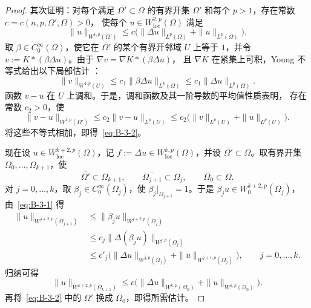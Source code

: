 \begin{proof}
其次证明：对每个满足 $\overline{\Omega'}\subset\Omega$ 的有界开集
$\Omega'$
和每个 $p>1$，存在常数 $c=c(n,p,\Omega',\Omega)>0$，
使每个 $u\in W^{2,p}_{\mathrm{loc}}(\Omega)$ 满足
\begin{equation}\label{eq:B-3-2}
  \|u\|_{W^{1,p}(\Omega')}
  \le c\bigl(\|\Delta u\|_{L^p(\Omega)}
  +\|u\|_{L^p(\Omega)}\bigr).
\end{equation}
取 $\beta\in C^\infty_0(\Omega)$，使它在
$\overline{\Omega'}$ 的某个有界开邻域 $U$ 上等于 $1$，并令
$v:=K*(\beta\Delta u)$。由于 $\nabla v=\nabla K*(\beta\Delta u)$，
且 $\nabla K$ 在紧集上可积，Young 不等式给出以下局部估计
：
\[
  \|v\|_{W^{1,p}(U)}
  \le c_1\|\beta\Delta u\|_{L^p(\Omega)}
  \le c_1\|\Delta u\|_{L^p(\Omega)}.
\]
函数 $v-u$ 在 $U$ 上调和。于是，调和函数及其一阶导数的平均值性质表明，
存在常数 $c_2>0$，使
\[
  \|v-u\|_{W^{1,p}(\Omega')}
  \le c_2\|v-u\|_{L^p(U)}
  \le c_2\bigl(\|v\|_{L^p(U)}+\|u\|_{L^p(U)}\bigr).
\]
将这些不等式相加，即得~\eqref{eq:B-3-2}。

现在设 $u\in W^{k+2,p}_{\mathrm{loc}}(\Omega)$，记
$f:=\Delta u\in W^{k,p}_{\mathrm{loc}}(\Omega)$，并设
$\overline{\Omega'}\subset\Omega$。取有界开集
$\Omega_0,\ldots,\Omega_{k+1}$，使
\[
  \overline{\Omega'}\subset\Omega_{k+1},\qquad
  \overline{\Omega_{j+1}}\subset\Omega_j,\qquad
  \overline{\Omega_0}\subset\Omega.
\]
对 $j=0,\ldots,k$，取
$\beta_j\in C^\infty_0(\Omega_j)$，使
$\beta_j|_{\Omega_{j+1}}=1$。于是
$\beta_j u\in W^{k+2,p}_0(\Omega_j)$，由~\eqref{eq:B-3-1} 得
\begin{align*}
  \|u\|_{W^{j+2,p}(\Omega_{j+1})}
  &\le \|\beta_j u\|_{W^{j+2,p}(\Omega_j)}\\
  &\le c_j\|\Delta(\beta_j u)\|_{W^{j,p}(\Omega_j)}\\
  &\le c'_j\bigl(\|\Delta u\|_{W^{j,p}(\Omega_j)}
    +\|u\|_{W^{j+1,p}(\Omega_j)}\bigr),
  \qquad j=0,\ldots,k.
\end{align*}
归纳可得
\[
  \|u\|_{W^{k+2,p}(\Omega_{k+1})}
  \le c\bigl(\|\Delta u\|_{W^{k,p}(\Omega_0)}
  +\|u\|_{W^{1,p}(\Omega_0)}\bigr).
\]
再将~\eqref{eq:B-3-2} 中的 $\Omega'$ 换成 $\Omega_0$，即得所需估计。
\end{proof}

